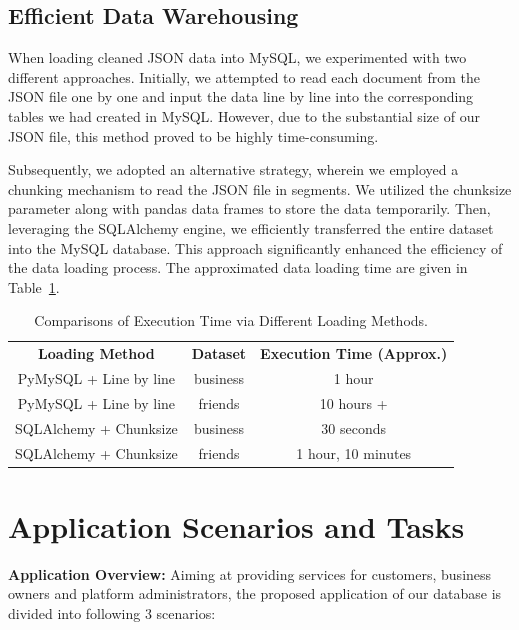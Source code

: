 \documentclass[runningheads]{llncs}
\begin{document}
\subsection{Efficient Data Warehousing}

When loading cleaned JSON data into MySQL, we experimented with two different approaches. Initially, we attempted to read each document from the JSON file one by one and input the data line by line into the corresponding tables we had created in MySQL. However, due to the substantial size of our JSON file, this method proved to be highly time-consuming.

Subsequently, we adopted an alternative strategy, wherein we employed a chunking mechanism to read the JSON file in segments. We utilized the chunksize parameter along with pandas data frames to store the data temporarily. Then, leveraging the SQLAlchemy engine, we efficiently transferred the entire dataset into the MySQL database. This approach significantly enhanced the efficiency of the data loading process. The approximated data loading time are given in Table~\ref{table:headings}.


\setlength{\tabcolsep}{4pt}
\begin{table}
\begin{center}
\caption{Comparisons of Execution Time via Different Loading Methods.}
\label{table:headings}
\begin{tabular}{c|c|c}
\hline\noalign{\smallskip}
{\bf Loading Method} & {\bf Dataset} & {\bf Execution Time (Approx.)}\\
\noalign{\smallskip}
\hline
\noalign{\smallskip}
PyMySQL + Line by line & business & 1 hour
\\
PyMySQL + Line by line & friends & 10 hours +
\\
\noalign{\smallskip}
\hline
\noalign{\smallskip}
SQLAlchemy + Chunksize & business & 30 seconds
\\
SQLAlchemy + Chunksize & friends & 1 hour, 10 minutes
\\
\hline
\end{tabular}
\end{center}
\end{table}
\setlength{\tabcolsep}{1.4pt}

\section{Application Scenarios and Tasks}

\textbf{Application Overview:} Aiming at providing services for customers, business owners and platform administrators, the proposed application of our database is divided into following 3 scenarios:
\end{document}
